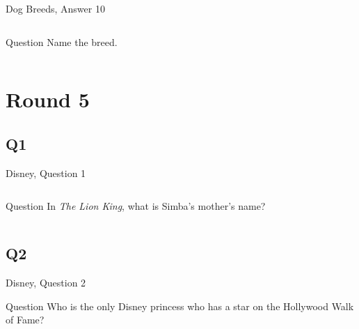 \documentclass[11pt]{beamer}
\begin{document}
\begin{frame}[t]{Dog Breeds, Answer 10}
\begin{columns}[T,totalwidth=\linewidth]
\begin{column}{0.32\linewidth}
\begin{block}{Question}
Name the breed.
\end{block}
\end{column}
\begin{column}{0.65\linewidth}
\begin{center}
\texttt{[image: \{Images/newfoundland]}.jpeg}
\end{center}
\end{column}
\end{columns}
\end{frame}
\def\thisSectionName{Disney}
\section{Round 5}
\subsection*{Q1}
\begin{frame}[t]{Disney, Question 1}
\begin{columns}[T,totalwidth=\linewidth]
\begin{column}{0.32\linewidth}
\begin{block}{Question}
In \emph{The Lion King}, what is Simba's mother's name?
\end{block}
\end{column}
\begin{column}{0.65\linewidth}
\begin{center}
\texttt{[image: \{Images/sarabi]}.jpeg}
\end{center}
\end{column}
\end{columns}
\end{frame}
\subsection*{Q2}
\begin{frame}[t]{Disney, Question 2}
\begin{block}{Question}
Who is the only Disney princess who has a star on the Hollywood Walk of Fame?
\end{block}
\end{frame}
\end{document}
